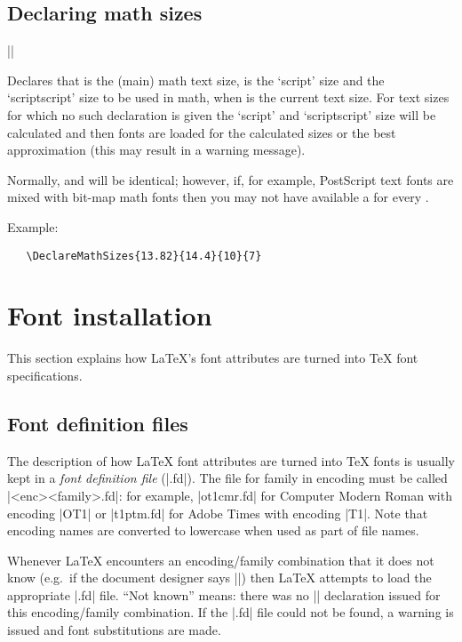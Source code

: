 \documentclass{ltxguide}[1995/11/28]
\begin{document}
\subsection{Declaring math sizes}
 
\begin{decl}
|\DeclareMathSizes|   
\end{decl}
 
Declares that  is the (main) math text size,  is
the `script' size and  the `scriptscript' size to be used
in math, when  is the current text size. For text sizes for
which no such declaration is given the `script' and `scriptscript'
size will be calculated and then fonts are loaded for the calculated
sizes or the best approximation (this may result in a warning
message).
 
Normally,  and  will be identical; however, if,
for example, PostScript text fonts are mixed with bit-map math fonts
then you may not have available a  for every .
 
Example:
\begin{verbatim}
   \DeclareMathSizes{13.82}{14.4}{10}{7}
\end{verbatim}
 
\section{Font installation}
\label{Sec:install}
 
This section explains how \LaTeX's font attributes are turned into
\TeX{} font specifications.
 
\subsection{Font definition files}
 
The description of how \LaTeX{} font attributes are turned into \TeX{}
fonts is usually kept in a \emph{font definition file} (|.fd|).  The
file for family  in encoding  must be
called |<enc><family>.fd|: for example, |ot1cmr.fd| for Computer
Modern Roman with encoding |OT1| or |t1ptm.fd| for Adobe Times with
encoding |T1|.  Note that encoding names are converted to lowercase
when used as part of file names.
 
Whenever \LaTeX{} encounters an encoding/family combination that it
does not know (e.g.~if the document designer says
|\selectfont|) then \LaTeX{} attempts to load the
appropriate |.fd| file.  ``Not known'' means: there was no
|\DeclareFontFamily| declaration issued for this encoding/family
combination.  If the |.fd| file could not be found, a warning is
issued and font substitutions are made.
 
\end{document}
